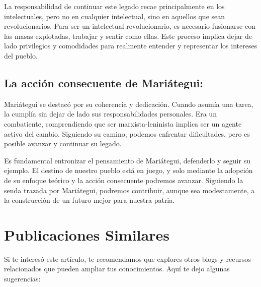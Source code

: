 \documentclass[
  jou,
  floatsintext,
  longtable,
  a4paper,
  nolmodern,
  notxfonts,
  notimes,
  12pt,
  colorlinks=true,linkcolor=blue,citecolor=blue,urlcolor=blue]{apa7}
\begin{document}
La responsabilidad de continuar este legado recae principalmente en los
intelectuales, pero no en cualquier intelectual, sino en aquellos que
sean revolucionarios. Para ser un intelectual revolucionario, es
necesario fusionarse con las masas explotadas, trabajar y sentir como
ellas. Este proceso implica dejar de lado privilegios y comodidades para
realmente entender y representar los intereses del pueblo.

\subsection{La acción consecuente de
Mariátegui:}\label{la-acciuxf3n-consecuente-de-mariuxe1tegui}

Mariátegui se destacó por su coherencia y dedicación. Cuando asumía una
tarea, la cumplía sin dejar de lado sus responsabilidades personales.
Era un combatiente, comprendiendo que ser marxista-leninista implica ser
un agente activo del cambio. Siguiendo su camino, podemos enfrentar
dificultades, pero es posible avanzar y continuar su legado.

Es fundamental entronizar el pensamiento de Mariátegui, defenderlo y
seguir su ejemplo. El destino de nuestro pueblo está en juego, y solo
mediante la adopción de su enfoque teórico y la acción consecuente
podremos avanzar. Siguiendo la senda trazada por Mariátegui, podremos
contribuir, aunque sea modestamente, a la construcción de un futuro
mejor para nuestra patria.

\section{Publicaciones Similares}\label{publicaciones-similares}

Si te interesó este artículo, te recomendamos que explores otros blogs y
recursos relacionados que pueden ampliar tus conocimientos. Aquí te dejo
algunas sugerencias:
\end{document}
